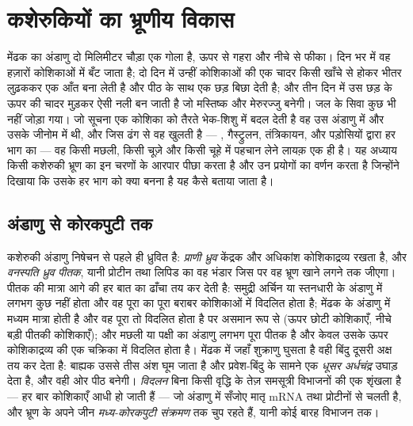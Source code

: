 \chapter{कशेरुकियों का भ्रूणीय विकास}\label{ch:b2:vertebrate-development}

मेंढक का अंडाणु दो मिलिमीटर चौड़ा एक गोला है, ऊपर से गहरा और
नीचे से फीका। दिन भर में वह हज़ारों कोशिकाओं में बँट जाता है; दो दिन में
उन्हीं कोशिकाओं की एक चादर किसी खाँचे से होकर भीतर लुढ़ककर एक आँत बना
लेती है और पीठ के साथ एक छड़ बिछा देती है; और तीन दिन में उस छड़ के ऊपर
की चादर मुड़कर ऐसी नली बन जाती है जो मस्तिष्क और मेरुरज्जु बनेगी। जल के
सिवा कुछ भी नहीं जोड़ा गया। जो सूचना एक कोशिका को तैरते भेक-शिशु में बदल
देती है वह उस अंडाणु में और उसके जीनोम में थी, और जिस ढंग से वह खुलती है
--- , गैस्ट्रुलन, तंत्रिकायन, और पड़ोसियों द्वारा हर भाग का 
--- वह किसी मछली, किसी चूज़े और किसी चूहे में पहचान लेने लायक़ एक ही है।
यह अध्याय किसी कशेरुकी भ्रूण का इन चरणों के आरपार पीछा करता है और उन
प्रयोगों का वर्णन करता है जिन्होंने दिखाया कि उसके हर भाग को क्या बनना है यह कैसे बताया जाता है।

\section{अंडाणु से कोरकपुटी तक}

\begin{definition}[अंडाणु और उसकी अक्षें]\label{def:b2:vertebrate-development:egg}
कशेरुकी अंडाणु निषेचन से पहले ही ध्रुवित है:
\emph{प्राणी ध्रुव} केंद्रक और अधिकांश कोशिकाद्रव्य रखता है, और
\emph{वनस्पति ध्रुव} \emph{पीतक}, यानी प्रोटीन तथा लिपिड का वह भंडार
जिस पर वह भ्रूण खाने लगने तक जीएगा। पीतक की मात्रा
आगे की हर बात का ढाँचा तय कर देती है: समुद्री अर्चिन या स्तनधारी के
अंडाणु में लगभग कुछ नहीं होता और वह पूरा का पूरा बराबर कोशिकाओं में
विदलित होता है; मेंढक के अंडाणु में मध्यम मात्रा होती है और वह पूरा तो
विदलित होता है पर असमान रूप से (ऊपर छोटी कोशिकाएँ, नीचे बड़ी पीतकी
कोशिकाएँ); और मछली या पक्षी का अंडाणु लगभग पूरा पीतक है और केवल उसके
ऊपर कोशिकाद्रव्य की एक चक्रिका में विदलित होता है।
मेंढक में जहाँ शुक्राणु घुसता है वही बिंदु दूसरी अक्ष तय कर देता है:
बाह्यक उससे तीस अंश घूम जाता है और प्रवेश-बिंदु के सामने एक
\emph{धूसर अर्धचंद्र} उघाड़ देता है, और वही ओर पीठ
बनेगी। \emph{विदलन} बिना किसी वृद्धि के तेज़ समसूत्री विभाजनों की एक
शृंखला है --- हर बार कोशिकाएँ आधी हो जाती हैं --- जो अंडाणु में सँजोए
मातृ mRNA तथा प्रोटीनों से चलती है, और भ्रूण के अपने जीन
\emph{मध्य-कोरकपुटी संक्रमण} तक चुप रहते हैं, यानी कोई बारह
विभाजन तक।
\end{definition}

